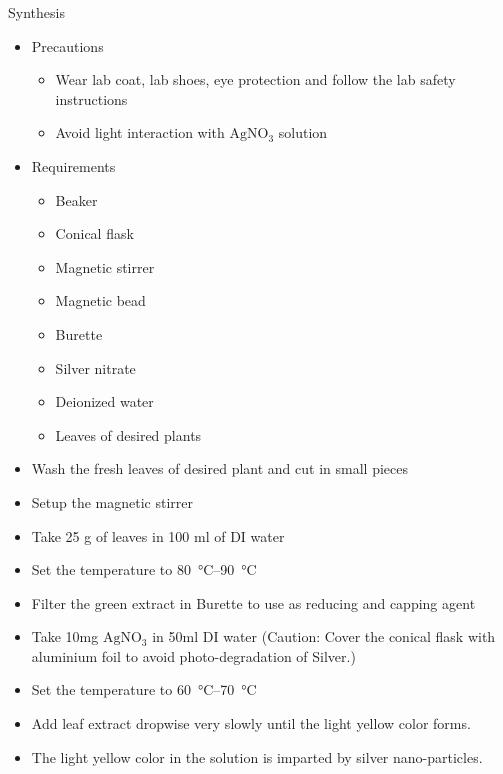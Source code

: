 \documentclass[11pt,dvipsnames,ignorenonframetext,aspectratio=169]{beamer}
\providecommand{\tightlist}{%
  \setlength{\itemsep}{0pt}\setlength{\parskip}{0pt}}
\begin{document}
\begin{frame}{Synthesis}
\protect\hypertarget{synthesis-1}{}
\footnotesize

\begin{itemize}
\tightlist
\item
  Precautions

  \begin{itemize}
  \scriptsize
  \item Wear lab coat, lab shoes, eye protection and follow the lab safety instructions
  \item Avoid light interaction with $\mathrm{Ag NO_3}$ solution 
  \end{itemize}
\item
  Requirements \setlength{\multicolsep}{4pt plus 1pt minus 1.5pt}

  \begin{multicols}{3}
  \begin{itemize}
  \setlength{\parskip}{0.1\baselineskip}
  \scriptsize
  \item Beaker
  \item Conical flask
  \item Magnetic stirrer
  \item Magnetic bead
  \item Burette
  \item Silver nitrate
  \item Deionized water
  \item Leaves of desired plants
  \end{itemize}
  \end{multicols}
\end{itemize}

\footnotesize

\begin{itemize}
\tightlist
\item
  Wash the fresh leaves of desired plant and cut in small pieces
\item
  Setup the magnetic stirrer
\item
  Take 25 g of leaves in 100 ml of DI water
\item
  Set the temperature to \SIrange{80}{90}{\celsius}
\item
  Filter the green extract in Burette to use as reducing and capping
  agent
\item
  Take 10mg \(\mathrm{Ag NO_3}\) in 50ml DI water (Caution: Cover the
  conical flask with aluminium foil to avoid photo-degradation of
  Silver.)
\item
  Set the temperature to \SIrange{60}{70}{\celsius}
\item
  Add leaf extract dropwise very slowly until the light yellow color
  forms.
\item
  The light yellow color in the solution is imparted by silver
  nano-particles.
\end{itemize}
\end{frame}
\end{document}
